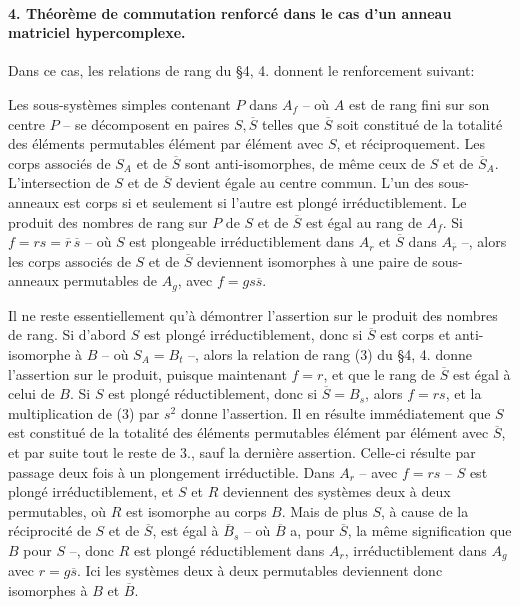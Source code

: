 \paragraph{4. Théorème de commutation renforcé dans le cas d'un anneau matriciel hypercomplexe.}
Dans ce cas, les relations de rang du \S 4, 4. donnent le renforcement suivant:

Les sous-systèmes simples contenant \(P\) dans \(A_f\) -- où \(A\) est de rang fini sur son centre \(P\) -- se décomposent en paires \(S,\overline S\) telles que \(\overline S\) soit constitué de la totalité des éléments permutables élément par élément avec \(S\), et réciproquement. Les corps associés de \(S_A\) et de \(\overline S\) sont anti-isomorphes, de même ceux de \(S\) et de \(\overline S_A\). L'intersection de \(S\) et de \(\overline S\) devient égale au centre commun. L'un des sous-anneaux est corps si et seulement si l'autre est plongé irréductiblement. Le produit des nombres de rang sur \(P\) de \(S\) et de \(\overline S\) est égal au rang de \(A_f\). Si \(f=rs=\overline r\,\overline s\) -- où \(S\) est plongeable irréductiblement dans \(A_r\) et \(\overline S\) dans \(A_{\overline r}\) --, alors les corps associés de \(S\) et de \(\overline S\) deviennent isomorphes à une paire de sous-anneaux permutables de \(A_g\), avec \(f=g s\overline s\).

Il ne reste essentiellement qu'à démontrer l'assertion sur le produit des nombres de rang. Si d'abord \(S\) est plongé irréductiblement, donc si \(\overline S\) est corps et anti-isomorphe à \(B\) -- où \(S_A=B_t\) --, alors la relation de rang (3) du \S 4, 4. donne l'assertion sur le produit, puisque maintenant \(f=r\), et que le rang de \(\overline S\) est égal à celui de \(B\). Si \(S\) est plongé réductiblement, donc si \(\overline S=B_s\), alors \(f=rs\), et la multiplication de (3) par \(s^2\) donne l'assertion. Il en résulte immédiatement que \(S\) est constitué de la totalité des éléments permutables élément par élément avec \(\overline S\), et par suite tout le reste de 3., sauf la dernière assertion. Celle-ci résulte par passage deux fois à un plongement irréductible. Dans \(A_r\) -- avec \(f=rs\) -- \(S\) est plongé irréductiblement, et \(S\) et \(R\) deviennent des systèmes deux à deux permutables, où \(R\) est isomorphe au corps \(B\). Mais de plus \(S\), à cause de la réciprocité de \(S\) et de \(\overline S\), est égal à \(\overline B_s\) -- où \(\overline B\) a, pour \(\overline S\), la même signification que \(B\) pour \(S\) --, donc \(R\) est plongé réductiblement dans \(A_r\), irréductiblement dans \(A_g\) avec \(r=g\overline s\). Ici les systèmes deux à deux permutables deviennent donc isomorphes à \(B\) et \(\overline B\).

\clearpage
